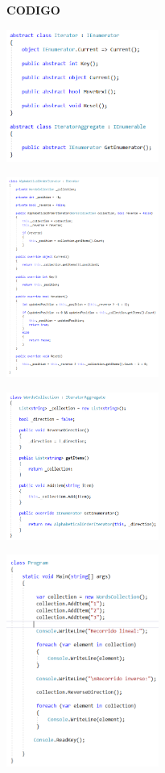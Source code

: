 \documentclass[twoside,twocolumn]{article}
\begin{document}
    \item \textbf{CODIGO}
    \begin{center}
        \includegraphics[width=5cm]{./img/Iterator1.png} 
    \end{center}
    \begin{center}
        \includegraphics[width=5cm]{./img/Iterator2.png} 
    \end{center}
    \begin{center}
        \includegraphics[width=5cm]{./img/Iterator3.png} 
    \end{center}
    \begin{center}
        \includegraphics[width=5cm]{./img/Iterator4.png} 
    \end{center}
\end{document}
